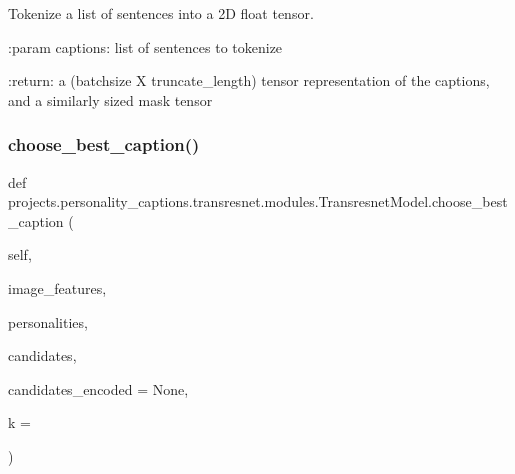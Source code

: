 \begin{DoxyVerb}Tokenize a list of sentences into a 2D float tensor.

:param captions:
    list of sentences to tokenize

:return:
    a (batchsize X truncate_length) tensor representation of the captions,
    and a similarly sized mask tensor
\end{DoxyVerb}
 \mbox{\label{classprojects_1_1personality__captions_1_1transresnet_1_1modules_1_1TransresnetModel_a9f2a69ead8d29f468ec6c87fbf950b57}} 
\subsubsection{\texorpdfstring{choose\+\_\+best\+\_\+caption()}{choose\_best\_caption()}}
{\footnotesize\ttfamily def projects.\+personality\+\_\+captions.\+transresnet.\+modules.\+Transresnet\+Model.\+choose\+\_\+best\+\_\+caption (\begin{DoxyParamCaption}\item[{}]{self,  }\item[{}]{image\+\_\+features,  }\item[{}]{personalities,  }\item[{}]{candidates,  }\item[{}]{candidates\+\_\+encoded = {\ttfamily None},  }\item[{}]{k = {} }\end{DoxyParamCaption})}

